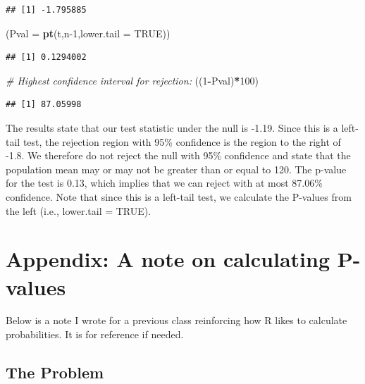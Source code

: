 \documentclass[
]{book}
\newenvironment{Shaded}{\begin{snugshade}}{\end{snugshade}}
\newcommand{\AttributeTok}[1]{\textcolor[rgb]{0.13,0.29,0.53}{#1}}
\newcommand{\CommentTok}[1]{\textcolor[rgb]{0.56,0.35,0.01}{\textit{#1}}}
\newcommand{\ConstantTok}[1]{\textcolor[rgb]{0.56,0.35,0.01}{#1}}
\newcommand{\DecValTok}[1]{\textcolor[rgb]{0.00,0.00,0.81}{#1}}
\newcommand{\FunctionTok}[1]{\textcolor[rgb]{0.13,0.29,0.53}{\textbf{#1}}}
\newcommand{\NormalTok}[1]{#1}
\newcommand{\SpecialCharTok}[1]{\textcolor[rgb]{0.81,0.36,0.00}{\textbf{#1}}}
\begin{document}
\begin{verbatim}
## [1] -1.795885
\end{verbatim}

\begin{Shaded}
\begin{Highlighting}[]
\NormalTok{(}\AttributeTok{Pval =} \FunctionTok{pt}\NormalTok{(t,n}\DecValTok{{-}1}\NormalTok{,}\AttributeTok{lower.tail =} \ConstantTok{TRUE}\NormalTok{))}
\end{Highlighting}
\end{Shaded}

\begin{verbatim}
## [1] 0.1294002
\end{verbatim}

\begin{Shaded}
\begin{Highlighting}[]
\CommentTok{\# Highest confidence interval for rejection:}
\NormalTok{((}\DecValTok{1}\SpecialCharTok{{-}}\NormalTok{Pval)}\SpecialCharTok{*}\DecValTok{100}\NormalTok{)}
\end{Highlighting}
\end{Shaded}

\begin{verbatim}
## [1] 87.05998
\end{verbatim}

The results state that our test statistic under the null is -1.19. Since this is a left-tail test, the rejection region with 95\% confidence is the region to the right of -1.8. We therefore do not reject the null with 95\% confidence and state that the population mean may or may not be greater than or equal to 120. The p-value for the test is 0.13, which implies that we can reject with at most 87.06\% confidence. Note that since this is a left-tail test, we calculate the P-values from the left (i.e., lower.tail = TRUE).

\section{Appendix: A note on calculating P-values}\label{appendix-a-note-on-calculating-p-values}

Below is a note I wrote for a previous class reinforcing how R likes to calculate probabilities. It is for reference if needed.

\subsection{The Problem}\label{the-problem}
\end{document}
